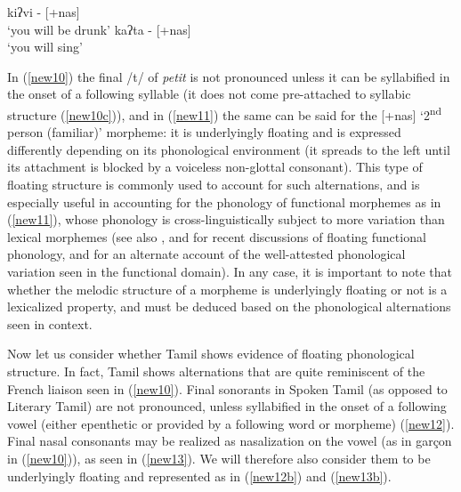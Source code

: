 \documentclass[output=paper]{langscibook}
\begin{document}
\begin{exe}
\ex \label{new11}\citep[68]{piggott1992variability}
\begin{xlist}
\ex \label{new11a}
kiʔvi - [+nas]\\\relax[kĩʔvĩ] \glt ‘you will be drunk’
{\ex \label{new11b}
kaʔta - [+nas]\\\relax[kaʔtã]\glt‘you will sing’}
\end{xlist}
\end{exe}

In (\ref{new10}) the final /t/ of \textit{petit} is not pronounced unless it can be syllabified in the onset of a following syllable (it does not come pre-attached to syllabic structure (\ref{new10c})), and in (\ref{new11}) the same can be said for the [+nas] ‘2\textsuperscript{nd} person (familiar)’ morpheme: it is underlyingly floating and is expressed differently depending on its phonological environment (it spreads to the left until its attachment is blocked by a voiceless non-glottal consonant). This type of floating structure is commonly used to account for such alternations, and is especially useful in accounting for the phonology of functional morphemes as in (\ref{new11}), whose phonology is cross-linguistically subject to more variation than lexical morphemes (see also \citealt{FaustUlfsbjorninn2018}, and \citealt{newell2019functional} for recent discussions of floating functional phonology, and \citealt{Selkirk1996} for an alternate account of the well-attested phonological variation seen in the functional domain). In any case, it is important to note that whether the melodic structure of a morpheme is underlyingly floating or not is a lexicalized property, and must be deduced based on the phonological alternations seen in context. 

Now let us consider whether Tamil shows evidence of floating phonological structure. In fact, Tamil shows alternations that are quite reminiscent of the French liaison seen in (\ref{new10}). Final sonorants in Spoken Tamil (as opposed to Literary Tamil) are not pronounced, unless syllabified in the onset of a following vowel (either epenthetic or provided by a following word or morpheme) (\ref{new12}). Final nasal consonants may be realized as nasalization on the vowel (as in garçon in (\ref{new10})), as seen in (\ref{new13}). We will therefore also consider them to be underlyingly floating and represented as in (\ref{new12b}) and (\ref{new13b}).
\end{document}

